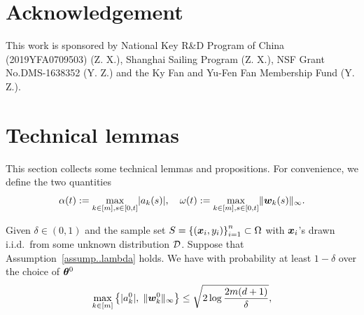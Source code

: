 \documentclass[twoside,11pt]{article}
\begin{document}
\section{Acknowledgement}
This work is sponsored by National Key R\&D Program of China (2019YFA0709503) (Z. X.), Shanghai Sailing Program (Z. X.), NSF Grant No.DMS-1638352 (Y. Z.) and the Ky Fan and Yu-Fen Fan Membership Fund (Y. Z.).

% 


\appendix
\section{Technical lemmas}
This section collects some technical lemmas and propositions. For convenience, we define the two quantities
\begin{equation}
    \alpha(t):=\max\limits_{k\in[m],s\in[0,t]}\lvert a_k(s)\rvert, \quad \omega(t):=\max\limits_{k\in[m],s\in[0,t]}\lVert\bm{w}_k(s)\rVert_{\infty}.
\end{equation}
\begin{lem}\label{lem..InitialParameter}
    Given $\delta\in(0,1)$ and the sample set $S = {\{(\bm{x}_i, y_i)\}}_{i=1}^n\subset\Omega$ with $\bm{x}_i$'s drawn i.i.d.\ from some unknown distribution $\mathcal{D}$. Suppose that Assumption~\ref{assump..lambda} holds. We have with probability at least $1-\delta$ over the choice of $\bm{\theta}^0$
    \begin{equation}\label{eqn:lem1}
        \max\limits_{k\in[m]}\left\{\lvert a_k^0\rvert,\;\lVert\bm{w}_k^0\rVert_{\infty}\right \}\leq \sqrt{2\log\frac{2m(d+1)}{\delta}},
    \end{equation}
\end{lem}
\end{document}
